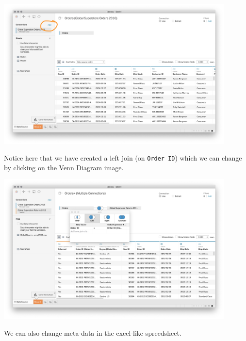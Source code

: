 \documentclass[xcolor=svgnames]{beamer} %
\begin{document}
\begin{frame}
\begin{center}
\includegraphics[width=0.9\textwidth]{img/add}
\end{center}
\end{frame}

\begin{frame}
Notice here that we have created a \alert{left join} (on {\tt Order ID}) which we can change by clicking on the Venn Diagram image.
\begin{center}
\includegraphics[width=0.9\textwidth]{img/leftjoin}
\end{center}
We can also change meta-data in the excel-like spreedsheet.
\end{frame}
\end{document}

